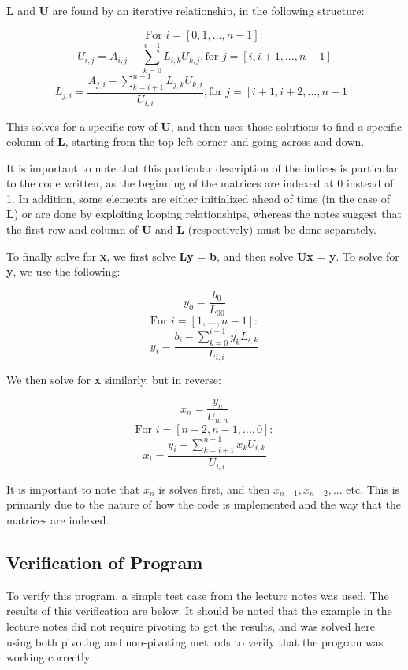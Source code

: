 \documentclass[10pt,letter]{article}
\begin{document}
$\textbf{L}$ and $\textbf{U}$ are found by an iterative relationship, in the following structure:

$$ \text{For } i = [0,1,...,n-1]: $$
$$ U_{i,j} = A_{i,j} -  \sum_{k=0}^{i-1} L_{i,k}U_{k,j}, \text{for } j = [i,i+1,...,n-1] $$
$$ L_{j,i} = \frac{A_{j,i} -  \sum_{k=i+1}^{n-1} L_{j,k}U_{k,i} }{U_{i,i}} , \text{for } j = [i+1,i+2,...,n-1] $$

This solves for a specific row of \textbf{U}, and then uses those solutions to find a specific column of \textbf{L}, starting from the top left corner and going across and down.

It is important to note that this particular description of the indices is particular to the code written, as the beginning of the matrices are indexed at 0 instead of 1. In addition, some elements are either initialized ahead of time (in the case of \textbf{L}) or are done by exploiting looping relationships, whereas the notes suggest that the first row and column of \textbf{U} and \textbf{L} (respectively) must be done separately.

To finally solve for \textbf{x}, we first solve \textbf{Ly} = \textbf{b}, and then solve \textbf{Ux} = \textbf{y}. To solve for \textbf{y}, we use the following:

$$y_0 = \frac{b_0}{L_{00}}$$
$$ \text{For } i = [1,...,n-1]: $$
$$ y_i = \frac{b_i - \sum_{k=0}^{i-1} y_k L_{i,k}}{L_{i,i}} $$

We then solve for \textbf{x} similarly, but in reverse:

$$x_n = \frac{y_n}{U_{n,n}}$$
$$ \text{For } i = [n-2,n-1,...,0]: $$
$$ x_i = \frac{y_i - \sum_{k=i+1}^{n-1} x_k U_{i,k}}{U_{i,i}} $$

It is important to note that $x_n$ is solves first, and then $x_{n-1}, x_{n-2},...$ etc. This is primarily due to the nature of how the code is implemented and the way that the matrices are indexed.

\subsection{Verification of Program}

To verify this program, a simple test case from the lecture notes was used. The results of this verification are below. It should be noted that the example in the lecture notes did not require pivoting to get the results, and was solved here using both pivoting and non-pivoting methods to verify that the program was working correctly.
\end{document}

